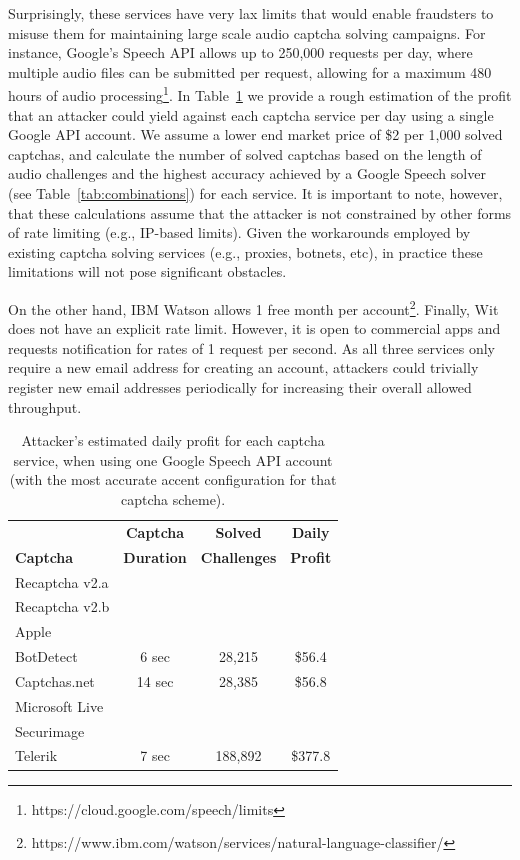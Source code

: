Surprisingly, these services have very lax limits that would enable fraudsters to misuse
them for maintaining large scale audio captcha solving campaigns. For instance, Google's Speech API allows up
to 250,000 requests per day, where multiple audio files can be submitted per request, allowing for a maximum 
480 hours of audio processing\footnote{https://cloud.google.com/speech/limits}. 
In Table~\ref{tab:money} we provide a rough estimation of the profit that an attacker could yield against 
each captcha service per day using a single Google API account. We assume a lower end market price of \$2 
per 1,000 solved captchas, and calculate the number of solved captchas based on the length of audio challenges 
and the highest accuracy achieved by a Google Speech solver (see Table~\ref{tab:combinations}) for each service.
 It is important to note, however, that these calculations assume that the attacker 
is not constrained by other forms of rate limiting (e.g., IP-based limits). Given the workarounds employed
by existing captcha solving services (e.g., proxies, botnets, etc), in practice these limitations will not 
pose significant obstacles.

On the other hand, IBM Watson allows 1 free month per account\footnote{https://www.ibm.com/watson/services/natural-language-classifier/}.
Finally, Wit does not have an explicit rate limit. However, it is open to commercial
apps and requests notification for rates of 1 request per second. As all three services
only require a new email address for creating an account, attackers could trivially register 
new email addresses periodically for increasing their overall allowed throughput.

\begin{table}[t]
\centering
\caption{Attacker's estimated daily profit for each captcha service, when using one Google Speech API account
(with the most accurate accent configuration for that captcha scheme).}
\begin{tabular}{lccc}
\toprule
& \textbf{Captcha} & \textbf{Solved} & \textbf{Daily} \\
\textbf{Captcha}&  \textbf{Duration} & \textbf{Challenges} & \textbf{Profit} \\
\hline
Recaptcha v2.a & & & \\
\rowcolor{Gray}
Recaptcha v2.b & & & \\
Apple  & & & \\
\rowcolor{Gray}
BotDetect  & 6 sec & 28,215 & \$56.4 \\
Captchas.net & 14 sec & 28,385 & \$56.8 \\
\rowcolor{Gray}
Microsoft Live & & & \\
Securimage & & & \\
\rowcolor{Gray}
Telerik & 7 sec & 188,892 & \$377.8 \\
\bottomrule
\end{tabular}
\label{tab:money}
\end{table}

